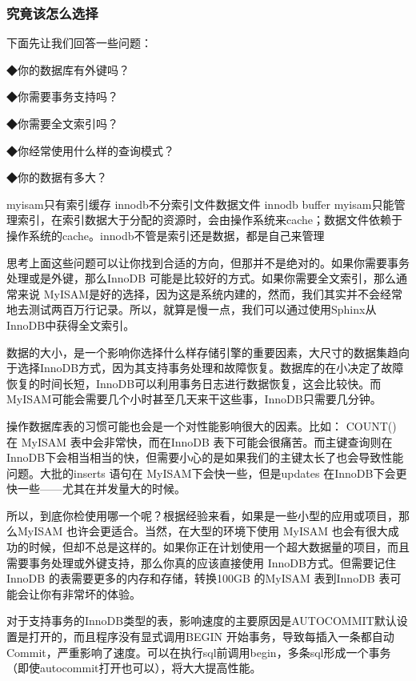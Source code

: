 \documentclass[UTF8]{ctexart}
\begin{document}
\subsubsection{究竟该怎么选择}

下面先让我们回答一些问题：   

◆你的数据库有外键吗？   

◆你需要事务支持吗？   

◆你需要全文索引吗？   

◆你经常使用什么样的查询模式？   

◆你的数据有多大？   
  
myisam只有索引缓存   
innodb不分索引文件数据文件 innodb buffer   
myisam只能管理索引，在索引数据大于分配的资源时，会由操作系统来cache；数据文件依赖于操作系统的cache。innodb不管是索引还是数据，都是自己来管理  
  
思考上面这些问题可以让你找到合适的方向，但那并不是绝对的。如果你需要事务处理或是外键，那么InnoDB 可能是比较好的方式。如果你需要全文索引，那么通常来说 MyISAM是好的选择，因为这是系统内建的，然而，我们其实并不会经常地去测试两百万行记录。所以，就算是慢一点，我们可以通过使用Sphinx从InnoDB中获得全文索引。  
  
数据的大小，是一个影响你选择什么样存储引擎的重要因素，大尺寸的数据集趋向于选择InnoDB方式，因为其支持事务处理和故障恢复。数据库的在小决定了故障恢复的时间长短，InnoDB可以利用事务日志进行数据恢复，这会比较快。而MyISAM可能会需要几个小时甚至几天来干这些事，InnoDB只需要几分钟。  
  
操作数据库表的习惯可能也会是一个对性能影响很大的因素。比如： COUNT() 在 MyISAM 表中会非常快，而在InnoDB 表下可能会很痛苦。而主键查询则在InnoDB下会相当相当的快，但需要小心的是如果我们的主键太长了也会导致性能问题。大批的inserts 语句在 MyISAM下会快一些，但是updates 在InnoDB下会更快一些——尤其在并发量大的时候。  
  
所以，到底你检使用哪一个呢？根据经验来看，如果是一些小型的应用或项目，那么MyISAM 也许会更适合。当然，在大型的环境下使用 MyISAM 也会有很大成功的时候，但却不总是这样的。如果你正在计划使用一个超大数据量的项目，而且需要事务处理或外键支持，那么你真的应该直接使用 InnoDB方式。但需要记住InnoDB 的表需要更多的内存和存储，转换100GB 的MyISAM 表到InnoDB 表可能会让你有非常坏的体验。  
  
对于支持事务的InnoDB类型的表，影响速度的主要原因是AUTOCOMMIT默认设置是打开的，而且程序没有显式调用BEGIN 开始事务，导致每插入一条都自动Commit，严重影响了速度。可以在执行sql前调用begin，多条sql形成一个事务（即使autocommit打开也可以），将大大提高性能。  
\end{document}
